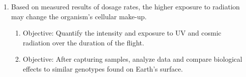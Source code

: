\begin{enumerate}
\item Based on measured results of dosage rates, the higher exposure to radiation may change the organism's cellular make-up.
	\begin{enumerate}
	\item Objective: Quantify the intensity and exposure to UV and cosmic radiation over the duration of the flight.
	\item Objective: After capturing samples, analyze data and compare biological effects to similar genotypes found on Earth's surface.
	\end{enumerate}
\end{enumerate}
